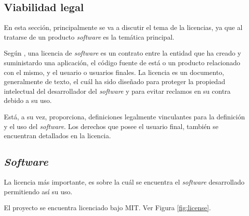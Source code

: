 \subsection{Viabilidad legal}
En esta sección, principalmente se va a discutir el tema de la licencias, ya que al tratarse de un producto \textit{software} es la temática principal.

Según \cite{softwareLicense}, una licencia de \textit{software} es un contrato entre la entidad que ha creado y suministardo una aplicación, el código fuente de está o un producto relacionado con el mismo, y el usuario o usuarios finales.
La licencia es un documento, generalmente de texto, el cuál ha sido diseñado para proteger la propiedad intelectual del desarrollador del \textit{software} y para evitar reclamos en su contra debido a su uso.

Está, a su vez, proporciona, definiciones legalmente vinculantes para la definición y el uso del \textit{software}. Los derechos que posee el usuario final, también se encuentran detallados en la licencia.

\clearpage
\subsection{\textit{Software}}
La licencia más importante, es sobre la cuál se encuentra el \textit{software} desarrollado permitiendo así su uso.

El proyecto se encuentra licenciado bajo MIT. Ver Figura \ref{fig:license}.
